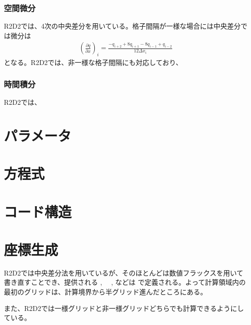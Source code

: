 \documentclass[letterpaper,10pt,dvipdfmx,report]{sphinxmanual}
\begin{document}
\subsection{空間微分}
\label{\detokenize{scheme:id2}}
R2D2では、4次の中央差分を用いている。格子間隔が一様な場合には中央差分では微分は
\begin{equation*}
\begin{split}\left(\frac{\partial q}{\partial x}\right)_i =\frac{-q_{i+2}+8q_{i+1}-8q_{i-1}+q_{i-2}}{12\Delta x_i}\end{split}
\end{equation*}
となる。R2D2では、非一様な格子間隔にも対応しており、


\subsection{時間積分}
\label{\detokenize{scheme:id3}}
R2D2では、


\chapter{パラメータ}
\label{\detokenize{parameter:id1}}\label{\detokenize{parameter::doc}}

\chapter{方程式}
\label{\detokenize{equation:id1}}\label{\detokenize{equation::doc}}

\chapter{コード構造}
\label{\detokenize{code:id1}}\label{\detokenize{code::doc}}

\chapter{座標生成}
\label{\detokenize{geometry:id1}}\label{\detokenize{geometry::doc}}
R2D2では中央差分法を用いているが、そのほとんどは数値フラックスを用いて書き直すことでき、提供される  , 　,  などは  で定義される。よって計算領域内の最初のグリッドは、計算境界から半グリッド進んだところにある。

また、R2D2では一様グリッドと非一様グリッドどちらでも計算できるようにしている。
\end{document}
